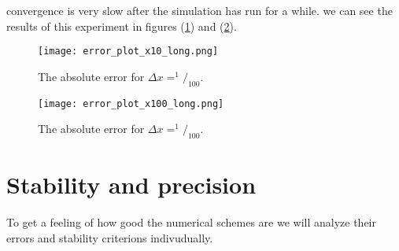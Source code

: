\documentclass[a4paper,english, 10pt, twoside]{article}
\begin{document}
convergence is very slow after the simulation has run for a while. we can see the results of this experiment in figures (\ref{errors_nx10_long}) and 
(\ref{errors_nx100_long}).
\begin{figure}[H]
 \centering
 \texttt{[image: error\_plot\_x10\_long.png]}
 \caption{The absolute error for $\Delta x = ^1/_{100}$. }
 \label{errors_nx10_long}
\end{figure}
\begin{figure}[H]
 \centering
 \texttt{[image: error\_plot\_x100\_long.png]}
 \caption{The absolute error for $\Delta x = ^1/_{100}$. }
 \label{errors_nx100_long}
\end{figure}

\section{Stability and precision}\label{stability}
To get a feeling of how good the numerical schemes are we will analyze their errors and stability criterions indivudually.
\end{document}
